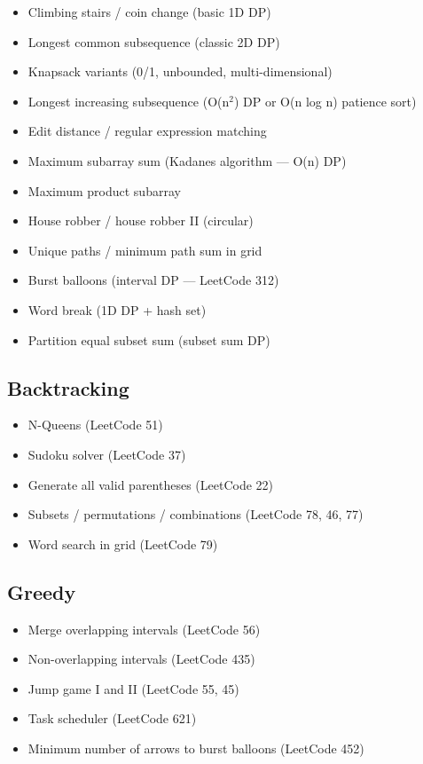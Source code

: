 \documentclass[11pt]{article}
\providecommand{\tightlist}{\setlength{\itemsep}{1pt}\setlength{\parskip}{0pt}}
\begin{document}
\begin{itemize}
\tightlist
\item
  Climbing stairs / coin change (basic 1D DP)
\item
  Longest common subsequence (classic 2D DP)
\item
  Knapsack variants (0/1, unbounded, multi-dimensional)
\item
  Longest increasing subsequence (O(n\(^2\)) DP or O(n log n) patience sort)
\item
  Edit distance / regular expression matching
\item
  Maximum subarray sum (Kadane\textquotesingle s algorithm --- O(n) DP)
\item
  Maximum product subarray
\item
  House robber / house robber II (circular)
\item
  Unique paths / minimum path sum in grid
\item
  Burst balloons (interval DP --- LeetCode 312)
\item
  Word break (1D DP + hash set)
\item
  Partition equal subset sum (subset sum DP)
\end{itemize}

\subsection{Backtracking}\label{backtracking}

\begin{itemize}
\tightlist
\item
  N-Queens (LeetCode 51)
\item
  Sudoku solver (LeetCode 37)
\item
  Generate all valid parentheses (LeetCode 22)
\item
  Subsets / permutations / combinations (LeetCode 78, 46, 77)
\item
  Word search in grid (LeetCode 79)
\end{itemize}

\subsection{Greedy}\label{greedy}

\begin{itemize}
\tightlist
\item
  Merge overlapping intervals (LeetCode 56)
\item
  Non-overlapping intervals (LeetCode 435)
\item
  Jump game I and II (LeetCode 55, 45)
\item
  Task scheduler (LeetCode 621)
\item
  Minimum number of arrows to burst balloons (LeetCode 452)
\end{itemize}
\end{document}
